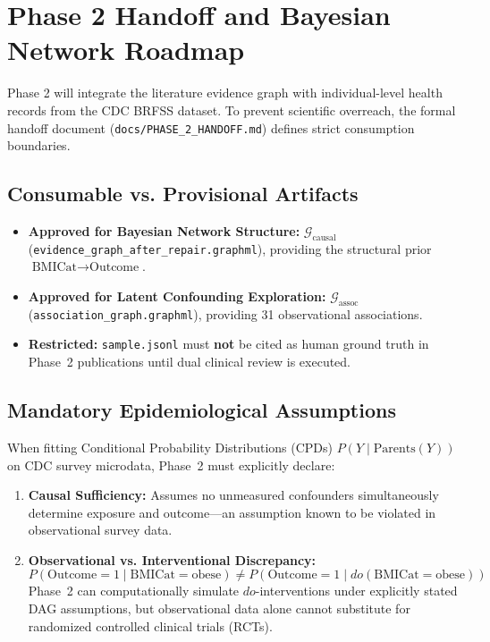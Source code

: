 \documentclass[11pt,a4paper]{article}
\begin{document}
\section{Phase 2 Handoff and Bayesian Network Roadmap}
\label{sec:phase2_handoff}

Phase 2 will integrate the literature evidence graph with individual-level health records from the CDC BRFSS dataset. To prevent scientific overreach, the formal handoff document (\texttt{docs/PHASE\_2\_HANDOFF.md}) defines strict consumption boundaries.

\subsection{Consumable vs. Provisional Artifacts}
\begin{itemize}[leftmargin=1.5em]
    \item \textbf{Approved for Bayesian Network Structure:} $\mathcal{G}_{\text{causal}}$ (\texttt{evidence\_graph\_after\_repair.graphml}), providing the structural prior $\text{BMICat} \rightarrow \text{Outcome}$.
    \item \textbf{Approved for Latent Confounding Exploration:} $\mathcal{G}_{\text{assoc}}$ (\texttt{association\_graph.graphml}), providing 31 observational associations.
    \item \textbf{Restricted:} \texttt{sample.jsonl} must \textbf{not} be cited as human ground truth in Phase~2 publications until dual clinical review is executed.
\end{itemize}

\subsection{Mandatory Epidemiological Assumptions}
When fitting Conditional Probability Distributions (CPDs) $P(Y \mid \text{Parents}(Y))$ on CDC survey microdata, Phase~2 must explicitly declare:
\begin{enumerate}[leftmargin=1.5em]
    \item \textbf{Causal Sufficiency:} Assumes no unmeasured confounders simultaneously determine exposure and outcome—an assumption known to be violated in observational survey data.
    \item \textbf{Observational vs. Interventional Discrepancy:}
    \begin{equation}
        P(\text{Outcome}=1 \mid \text{BMICat}=\text{obese}) \neq P(\text{Outcome}=1 \mid do(\text{BMICat}=\text{obese}))
    \end{equation}
    Phase~2 can computationally simulate $do$-interventions under explicitly stated DAG assumptions, but observational data alone cannot substitute for randomized controlled clinical trials (RCTs).
\end{enumerate}
\end{document}
